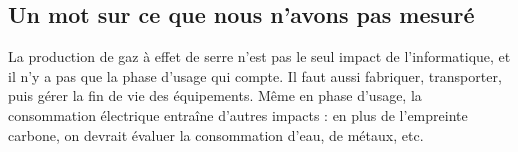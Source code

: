 \documentclass[a4paper,10pt]{article}
\begin{document}
\subsection{Un mot sur ce que nous n'avons pas mesuré}

La production de gaz à effet de serre n'est pas le seul impact de
l'informatique, et il n'y a pas que la phase d'usage qui compte. Il faut aussi
fabriquer, transporter, puis gérer la fin de vie des équipements. Même en phase
d'usage, la consommation électrique entraîne d'autres impacts : en plus de
l'empreinte carbone, on devrait évaluer la consommation d'eau, de métaux, etc.
\end{document}
